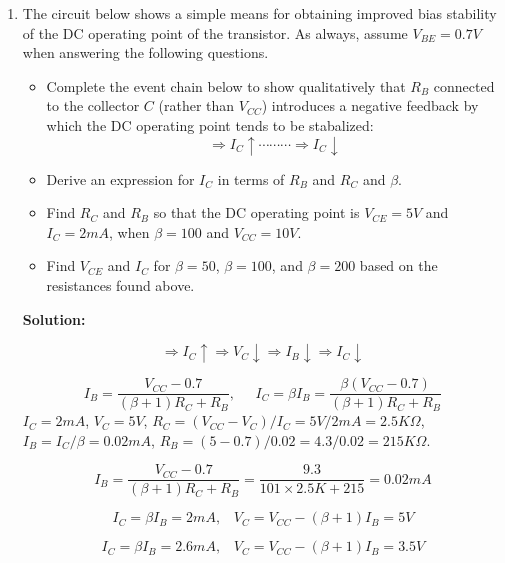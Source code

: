\begin{enumerate}

  {\bf Solution:} $\tau=L/(R_2+R_3)=10^{-2}/40=2.5\times 10^{-4}\,s$
  \[
  i_L(0^-)=i_L(0^+)=I_0\frac{R_1}{R_1+R_3}=5A\frac{20}{50}=2A,\;\;\;\;\;
  i_L(\infty)=0,\;\;\;\;\;i_L(t)=2\,e^{-t/\tau}
  \]
  \[ 
  v_1(t)=5A,\;\;\;\; v_2(t)=R_2 i_L(t)=20\,e^{-t/\tai},\;\;\;\;\;
  v_3(t)=R_3 i_L(t)=30\,e^{-t/\tai}
  \]

\item The circuit below shows a simple means for obtaining improved 
  bias stability of the DC operating point of the transistor. As 
  always, assume $V_{BE}=0.7V$ when answering the following questions.


  \begin{itemize}
  \item Complete the event chain below to show qualitatively that $R_B$
    connected to the collector $C$ (rather than $V_{CC}$) introduces a 
    negative feedback by which the DC operating point tends to be 
    stabalized:
    \[
    \Longrightarrow I_C \uparrow \cdots\cdots\cdots 
    \Longrightarrow I_C \downarrow     
    \]
  \item Derive an expression for $I_C$ in terms of $R_B$ and $R_C$ 
    and $\beta$.
  \item Find $R_C$ and $R_B$ so that the DC operating point is $V_{CE}=5V$ 
    and $I_C=2mA$, when $\beta=100$ and $V_{CC}=10V$.
  \item Find $V_{CE}$ and $I_C$ for $\beta=50$, $\beta=100$, and $\beta=200$ 
    based on the resistances found above.
  \end{itemize}

  {\bf Solution:}

  \[
  \Longrightarrow I_C \uparrow \Longrightarrow V_C \downarrow
  \Longrightarrow I_B \downarrow \Longrightarrow I_C \downarrow 
  \]

  \[
  I_B=\frac{V_{CC}-0.7}{(\beta+1)R_C+R_B},\;\;\;\;\;
  I_C=\beta I_B=\frac{\beta(V_{CC}-0.7)}{(\beta+1)R_C+R_B} 
  \]
  $I_C=2mA$, $V_C=5V$,  $R_C=(V_{CC}-V_C)/I_C=5V/2mA=2.5K\Omega$,  
  $I_B=I_C/\beta=0.02mA$,  $R_B=(5-0.7)/0.02=4.3/0.02=215K\Omega$.

  \[
  I_B=\frac{V_{CC}-0.7}{(\beta+1)R_C+R_B}=\frac{9.3}{101\times 2.5K+215}
  =0.02mA
  \]

  \[
  I_C=\beta I_B=2 mA,\;\;\;V_C=V_{CC}-(\beta+1)I_B=5V 
  \]

  \[
  I_C=\beta I_B=2.6mA,\;\;\;V_C=V_{CC}-(\beta+1)I_B=3.5V 
  \]



\end{enumerate}
